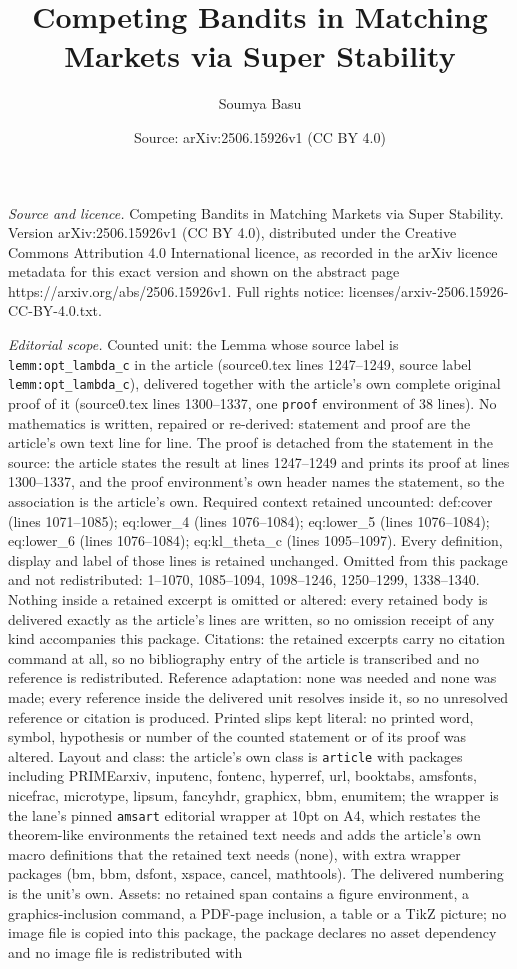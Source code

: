 \documentclass[10pt,a4paper]{amsart}
\title[Competing Bandits in Matching Markets via Super Stability]{Competing Bandits in Matching Markets via Super Stability}
\author{Soumya Basu}
\date{Source: arXiv:2506.15926v1 (CC BY 4.0)}
\begin{document}
\maketitle

\noindent\emph{Source and licence.} Competing Bandits in Matching Markets via Super Stability. Version arXiv:2506.15926v1 (CC BY 4.0), distributed under the Creative Commons Attribution 4.0 International licence, as recorded in the arXiv licence metadata for this exact version and shown on the abstract page https://arxiv.org/abs/2506.15926v1. Full rights notice: licenses/arxiv-2506.15926-CC-BY-4.0.txt.\par\smallskip

\noindent\textit{Editorial scope.} Counted unit: the Lemma whose source label is \texttt{lemm:opt\_lambda\_c} in the article (source0.tex lines 1247--1249, source label \texttt{lemm:opt\_lambda\_c}), delivered together with the article's own complete original proof of it (source0.tex lines 1300--1337, one \texttt{proof} environment of 38 lines). No mathematics is written, repaired or re-derived: statement and proof are the article's own text line for line. The proof is detached from the statement in the source: the article states the result at lines 1247--1249 and prints its proof at lines 1300--1337, and the proof environment's own header names the statement, so the association is the article's own. Required context retained uncounted: def:cover (lines 1071--1085); eq:lower\_4 (lines 1076--1084); eq:lower\_5 (lines 1076--1084); eq:lower\_6 (lines 1076--1084); eq:kl\_theta\_c (lines 1095--1097). Every definition, display and label of those lines is retained unchanged. Omitted from this package and not redistributed: 1--1070, 1085--1094, 1098--1246, 1250--1299, 1338--1340. Nothing inside a retained excerpt is omitted or altered: every retained body is delivered exactly as the article's lines are written, so no omission receipt of any kind accompanies this package. Citations: the retained excerpts carry no citation command at all, so no bibliography entry of the article is transcribed and no reference is redistributed. Reference adaptation: none was needed and none was made; every reference inside the delivered unit resolves inside it, so no unresolved reference or citation is produced. Printed slips kept literal: no printed word, symbol, hypothesis or number of the counted statement or of its proof was altered. Layout and class: the article's own class is \texttt{article} with packages including PRIMEarxiv, inputenc, fontenc, hyperref, url, booktabs, amsfonts, nicefrac, microtype, lipsum, fancyhdr, graphicx, bbm, enumitem; the wrapper is the lane's pinned \texttt{amsart} editorial wrapper at 10pt on A4, which restates the theorem-like environments the retained text needs and adds the article's own macro definitions that the retained text needs (none), with extra wrapper packages (bm, bbm, dsfont, xspace, cancel, mathtools). The delivered numbering is the unit's own. Assets: no retained span contains a figure environment, a graphics-inclusion command, a PDF-page inclusion, a table or a TikZ picture; no image file is copied into this package, the package declares no asset dependency and no image file is redistributed with 
\end{document}
